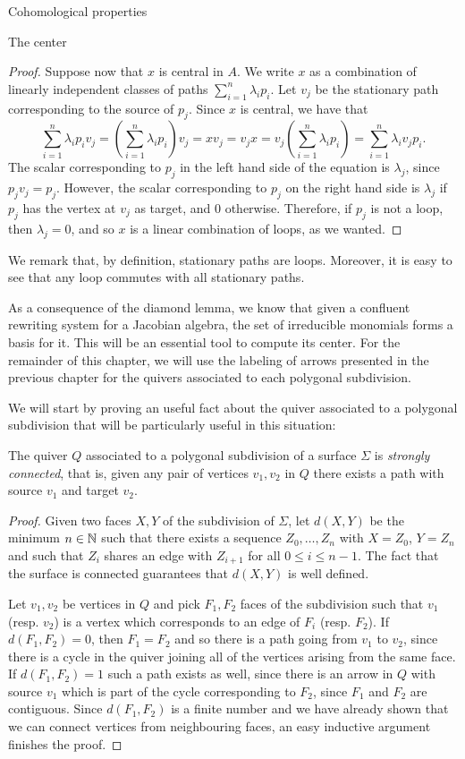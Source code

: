 \begin{chapter}{Cohomological properties}
\begin{section}{The center}
\begin{proof}
Suppose now that $x$ is central in $A$. We write $x$ as a combination of linearly independent classes of paths $\sum_{i=1}^n \lambda_i p_i$. Let $v_j$ be the stationary path corresponding to the source of $p_j$. Since $x$ is central, we have that
\[\sum_{i=1}^n \lambda_i p_iv_j=(\sum_{i=1}^n \lambda_i p_i)v_j = xv_j=v_jx = v_j(\sum_{i=1}^n \lambda_i p_i)=\sum_{i=1}^n \lambda_i v_jp_i.\]
The scalar corresponding to $p_j$ in the left hand side of the equation is $\lambda_j$, since $p_jv_j=p_j$. However, the scalar corresponding to $p_j$ on the right hand side is $\lambda_j$ if $p_j$ has the vertex at $v_j$ as target, and 0 otherwise. Therefore, if $p_j$ is not a loop, then $\lambda_j=0$, and so $x$ is a linear combination of loops, as we wanted.
\end{proof}

We remark that, by definition, stationary paths are loops. Moreover, it is easy to see that any loop commutes with all stationary paths.

As a consequence of the diamond lemma, we know that given a confluent rewriting system for a Jacobian algebra, the set of irreducible monomials forms a basis for it. This will be an essential tool to compute its center. For the remainder of this chapter, we will use the labeling of arrows presented in the previous chapter for the quivers associated to each polygonal subdivision.

We will start by proving an useful fact about the quiver associated to a polygonal subdivision that will be particularly useful in this situation:

\begin{lemma} The quiver $Q$ associated to a polygonal subdivision of a surface $\Sigma$ is \emph{strongly connected}, that is, given any pair of vertices $v_1, v_2$ in $Q$ there exists a path with source $v_1$ and target $v_2$.
\end{lemma}
\begin{proof} Given two faces $X,Y$ of the subdivision of $\Sigma$, let $d(X,Y)$ be the minimum $n\in \mathbb{N}$ such that there exists a sequence $Z_0,\dots,Z_n$ with $X=Z_0$, $Y=Z_n$ and such that $Z_i$ shares an edge with $Z_{i+1}$ for all $0\leq i\leq n-1$. The fact that the surface is connected guarantees that $d(X,Y)$ is well defined.

Let $v_1,v_2$ be vertices in $Q$ and pick $F_1, F_2$ faces of the subdivision such that $v_1$ (resp. $v_2$)  is a vertex which corresponds to an edge of $F_i$ (resp. $F_2$). If $d(F_1, F_2)=0$, then $F_1=F_2$ and so there is a path going from $v_1$ to $v_2$, since there is a cycle in the quiver joining all of the vertices arising from the same face. If $d(F_1,F_2)=1$ such a path exists as well, since there is an arrow in $Q$ with source $v_1$ which is part of the cycle corresponding to $F_2$, since $F_1$ and $F_2$ are contiguous. Since $d(F_1,F_2)$ is a finite number and we have already shown that we can connect vertices from neighbouring faces, an easy inductive argument finishes the proof.


\end{proof}
\end{section}
\end{chapter}
